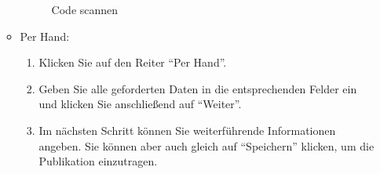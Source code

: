 \begin{enumerate}
\begin{itemize}
\begin{figure}[h!]
 \centering
 \caption{Code scannen}
 \label{figure010}
\end{figure}  
        \item Per Hand:
        \begin{enumerate}
            \item Klicken Sie auf den Reiter \enquote{Per Hand}.
            \item Geben Sie alle geforderten Daten in die entsprechenden Felder ein und klicken Sie anschließend auf \enquote{Weiter}. 
            \item Im nächsten Schritt können Sie weiterführende Informationen angeben. Sie können aber auch gleich auf \enquote{Speichern} klicken, um die Publikation einzutragen.
        \end{enumerate}        
    \end{itemize}
\end{enumerate}
